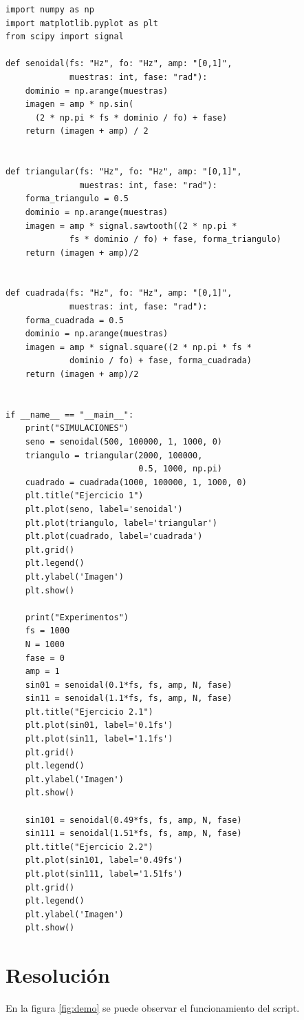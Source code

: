 \documentclass[
    11pt,
    spanish,
	a4paper
]{article}
\begin{document}
\begin{lstlisting}
import numpy as np
import matplotlib.pyplot as plt
from scipy import signal

def senoidal(fs: "Hz", fo: "Hz", amp: "[0,1]",
             muestras: int, fase: "rad"):
    dominio = np.arange(muestras)
    imagen = amp * np.sin(
      (2 * np.pi * fs * dominio / fo) + fase)
    return (imagen + amp) / 2


def triangular(fs: "Hz", fo: "Hz", amp: "[0,1]",
               muestras: int, fase: "rad"):
    forma_triangulo = 0.5
    dominio = np.arange(muestras)
    imagen = amp * signal.sawtooth((2 * np.pi *
             fs * dominio / fo) + fase, forma_triangulo)
    return (imagen + amp)/2


def cuadrada(fs: "Hz", fo: "Hz", amp: "[0,1]",
             muestras: int, fase: "rad"):
    forma_cuadrada = 0.5
    dominio = np.arange(muestras)
    imagen = amp * signal.square((2 * np.pi * fs *
             dominio / fo) + fase, forma_cuadrada)
    return (imagen + amp)/2


if __name__ == "__main__":
    print("SIMULACIONES")
    seno = senoidal(500, 100000, 1, 1000, 0)
    triangulo = triangular(2000, 100000,
                           0.5, 1000, np.pi)
    cuadrado = cuadrada(1000, 100000, 1, 1000, 0)
    plt.title("Ejercicio 1")
    plt.plot(seno, label='senoidal')
    plt.plot(triangulo, label='triangular')
    plt.plot(cuadrado, label='cuadrada')
    plt.grid()
    plt.legend()
    plt.ylabel('Imagen')
    plt.show()

    print("Experimentos")
    fs = 1000
    N = 1000
    fase = 0
    amp = 1
    sin01 = senoidal(0.1*fs, fs, amp, N, fase)
    sin11 = senoidal(1.1*fs, fs, amp, N, fase)
    plt.title("Ejercicio 2.1")
    plt.plot(sin01, label='0.1fs')
    plt.plot(sin11, label='1.1fs')
    plt.grid()
    plt.legend()
    plt.ylabel('Imagen')
    plt.show()

    sin101 = senoidal(0.49*fs, fs, amp, N, fase)
    sin111 = senoidal(1.51*fs, fs, amp, N, fase)
    plt.title("Ejercicio 2.2")
    plt.plot(sin101, label='0.49fs')
    plt.plot(sin111, label='1.51fs')
    plt.grid()
    plt.legend()
    plt.ylabel('Imagen')
    plt.show()
\end{lstlisting}

\section{Resolución}

En la figura \ref{fig:demo} se puede observar el funcionamiento del script.
\end{document}
